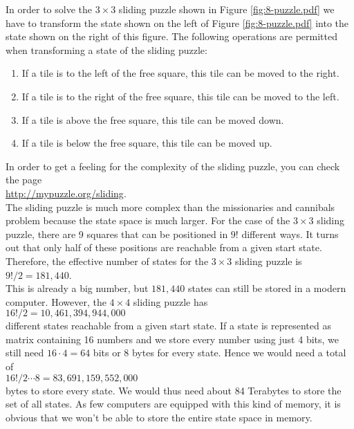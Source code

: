 In order to solve the $3 \times 3$ sliding puzzle shown in Figure \ref{fig:8-puzzle.pdf} we have to
transform the state shown on the left of Figure \ref{fig:8-puzzle.pdf} into the state shown on the
right of this figure.  The following operations are permitted when transforming a state of the
sliding puzzle:
\begin{enumerate}
\item If a tile is to the left  of the free square, this tile can be moved to the right.
\item If a tile is to the right of the free square, this tile can be moved to the left.
\item If a tile is above           the free square, this tile can be moved down.
\item If a tile is below           the free square, this tile can be moved up.
\end{enumerate}
In order to get a feeling for the complexity of the sliding puzzle, you can check the page
\\[0.2cm]
\hspace*{1.3cm}
\href{http://mypuzzle.org/sliding}{http://mypuzzle.org/sliding}.
\\[0.2cm]
The sliding puzzle is much more complex than the missionaries and cannibals problem because the
state space is much larger.  For the case of the $3 \times 3$ sliding puzzle, there are 9 squares
that can be positioned in $9!$ different ways.  It turns out that only half of these positions are
reachable from a given start state.  Therefore, the effective number of states for the $3 \times 3$
sliding puzzle is
\\[0.2cm]
\hspace*{1.3cm}
$9! / 2 = 181,440$.
\\[0.2cm]
This is already a big number, but $181,440$ states can still be stored in a modern computer.  However, the
$4 \times 4$ sliding puzzle has
\\[0.2cm]
\hspace*{1.3cm}
$16!/2 = 10,461,394,944,000$
\\[0.2cm]
different states reachable from a given start state.  If a state is represented as matrix containing
16 numbers and we store every number using just 4 bits, we still need $16 \cdot 4 = 64$ bits or 8
bytes for every state.  Hence we would need a total of
\\[0.2cm]
\hspace*{1.3cm}
$16! / 2 \cdots 8 = 83,691,159,552,000$
\\[0.2cm]
bytes to store every state. We would thus need about 84 Terabytes to store the set of all states.  As few
computers are equipped with this kind of memory, it is obvious that we won't be able to store the
entire state space in memory.

